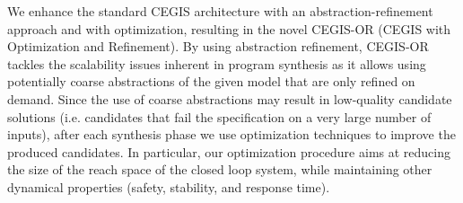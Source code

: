 \documentclass[sigconf]{llncs}
\begin{document}
%
We enhance the standard CEGIS architecture \cite{abate2017automated} with an abstraction-refinement approach 
and with optimization, resulting in the novel CEGIS-OR (CEGIS with Optimization and Refinement).  
By using abstraction refinement, CEGIS-OR tackles the
scalability issues inherent in program synthesis as it allows using
potentially coarse abstractions of the given model that are only refined on
demand.  Since the use of coarse abstractions may result in low-quality candidate solutions 
(i.e. candidates that fail the specification on a very large number of inputs), after each synthesis
phase we use optimization techniques to improve the produced
candidates.  In particular, our optimization procedure aims at
reducing the size of the reach space of the closed loop system, 
while maintaining other dynamical properties (safety, stability, and response time).

\end{document}
